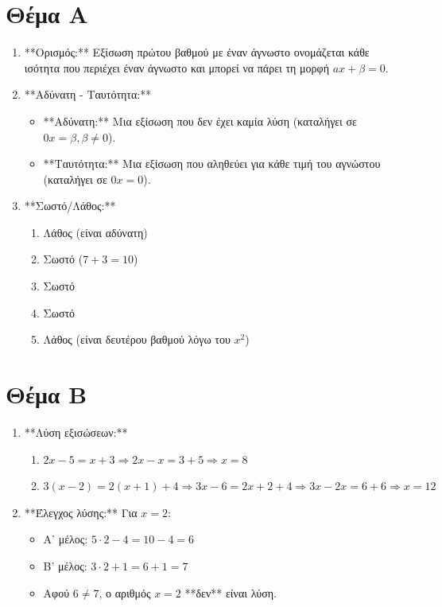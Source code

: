 \documentclass[11pt,a4paper,modern]{FFExercises}
\begin{document}

\section*{Θέμα Α}
\begin{enumerate}
    \item **Ορισμός:** Εξίσωση πρώτου βαθμού με έναν άγνωστο ονομάζεται κάθε ισότητα που περιέχει έναν άγνωστο και μπορεί να πάρει τη μορφή $ax + \beta = 0$.
    \item **Αδύνατη - Ταυτότητα:**
    \begin{itemize}
        \item **Αδύνατη:** Μια εξίσωση που δεν έχει καμία λύση (καταλήγει σε $0x = \beta, \beta \neq 0$).
        \item **Ταυτότητα:** Μια εξίσωση που αληθεύει για κάθε τιμή του αγνώστου (καταλήγει σε $0x = 0$).
    \end{itemize}
    \item **Σωστό/Λάθος:**
    \begin{enumerate}[label=\roman*)]
        \item Λάθος (είναι αδύνατη)
        \item Σωστό ($7+3=10$)
        \item Σωστό
        \item Σωστό
        \item Λάθος (είναι δευτέρου βαθμού λόγω του $x^2$)
    \end{enumerate}
\end{enumerate}

\section*{Θέμα Β}
\begin{enumerate}
    \item **Λύση εξισώσεων:**
    \begin{enumerate}[label=\roman*)]
        \item $2x - 5 = x + 3 \Rightarrow 2x - x = 3 + 5 \Rightarrow x = 8$
        \item $3(x - 2) = 2(x + 1) + 4 \Rightarrow 3x - 6 = 2x + 2 + 4 \Rightarrow 3x - 2x = 6 + 6 \Rightarrow x = 12$
    \end{enumerate}
    \item **Έλεγχος λύσης:** Για $x = 2$:
    \begin{itemize}
        \item Α' μέλος: $5 \cdot 2 - 4 = 10 - 4 = 6$
        \item Β' μέλος: $3 \cdot 2 + 1 = 6 + 1 = 7$
        \item Αφού $6 \neq 7$, ο αριθμός $x = 2$ **δεν** είναι λύση.
    \end{itemize}
\end{enumerate}
\end{document}
